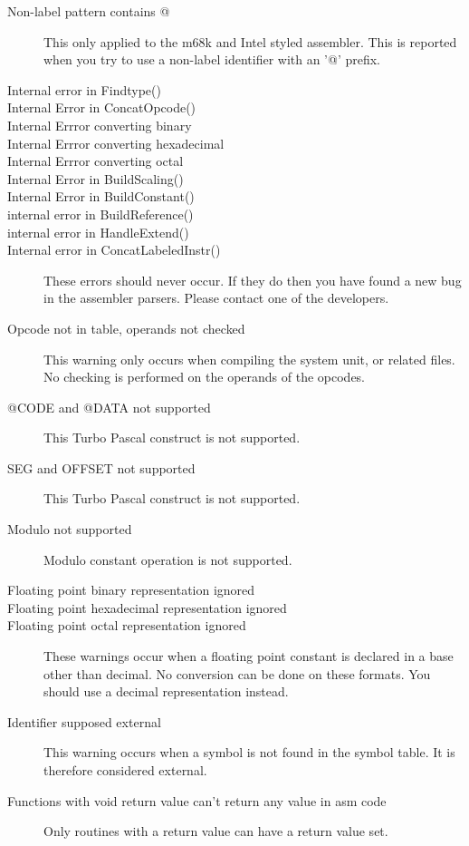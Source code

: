 \begin{description}
\item [Non-label pattern contains @]
This only applied to the m68k and Intel styled assembler. 
This is reported when you try to use a non-label identifier with an '@' prefix.
\item [Internal error in Findtype()]
\item [Internal Error in ConcatOpcode()]
\item [Internal Errror converting binary]
\item [Internal Errror converting hexadecimal]
\item [Internal Errror converting octal]
\item [Internal Error in BuildScaling()]
\item [Internal Error in BuildConstant()]
\item [internal error in BuildReference()]
\item [internal error in HandleExtend()]
\item [Internal error in ConcatLabeledInstr()]
\label{InternalError}
These errors should never occur. If they do then you have found
a new bug in the assembler parsers. Please contact one of the
developers.
\item [Opcode not in table, operands not checked]
This warning only occurs when compiling the system unit, or related
files. No checking is performed on the operands of the opcodes.

\item [@CODE and @DATA not supported]
This Turbo Pascal construct is not supported.
\item [SEG and OFFSET not supported]
This Turbo Pascal construct is not supported.
\item [Modulo not supported]
Modulo constant operation is not supported.
\item [Floating point binary representation ignored]
\item [Floating point hexadecimal representation ignored]
\item [Floating point octal representation ignored]
These warnings occur when a floating point constant is declared in
a base other than decimal. No conversion can be done on these formats.
You should use a decimal representation instead.
\item [Identifier supposed external]
This warning occurs when a symbol is not found in the symbol table. 
It is therefore considered external.
\item [Functions with void return value can't return any value in asm code]
Only routines with a return value can have a return value set.


\end{description}
